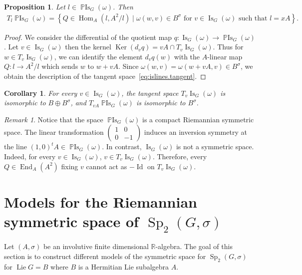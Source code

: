 \documentclass[a4paper,oneside,11pt]{amsart}
\DeclareMathOperator{\Ker}{Ker}
\DeclareMathOperator{\Hom}{Hom}
\DeclareMathOperator{\Id}{Id}
\DeclareMathOperator{\Sp}{Sp}
\DeclareMathOperator{\End}{End}
\DeclareMathOperator{\Lie}{Lie}
\DeclareMathOperator{\Is}{Is}
\DeclareMathOperator{\PIs}{\mathbb{P}Is}
\newcommand{\R}{\mathbb R}
\theoremstyle{plain}
\newtheorem{cor}[teo]{Corollary}
\newtheorem{prop}[teo]{Proposition}
\theoremstyle{definition}
\theoremstyle{remark}
\newtheorem{rem}[teo]{Remark}
\begin{document}
\begin{prop}\label{prop:islines.tangent}
    Let $l\in\PIs_G(\omega)$. Then
    \begin{align}\label{eq:islines.tangent}
    T_l\PIs_G(\omega)=\left\{Q\in\Hom_A(l,A^2/l)\mid \omega(w,v)\in B^\sigma\text{ for $v\in\Is_G(\omega)$ such that $l=xA$}\right\}.
    \end{align}
\end{prop}

\begin{proof}
    We consider the differential of the quotient map $q\colon \Is_G(\omega)\to \PIs_G(\omega)$. Let $v\in \Is_G(\omega)$ then the kernel $\Ker(d_vq)=vA\cap T_v\Is_G(\omega)$. Thus for $w\in T_v\Is_G(\omega)$, we can identify the element $d_vq(w)$ with the $A$-linear map $Q\colon l\to A^2/l$ which sends $w$ to $w+vA$. Since $\omega(w,v)=\omega(w+vA,v)\in B^\sigma$, we obtain the description of the tangent space~\eqref{eq:islines.tangent}.
\end{proof}

\begin{cor}
    For every $v\in\Is_G(\omega)$, the tangent space $T_v\Is_G(\omega)$ is isomorphic to $B\oplus B^\sigma$, and $T_{vA}\PIs_G(\omega)$ is isomorphic to $B^\sigma$.
\end{cor}

\begin{rem}
    Notice that the space $\PIs_G(\omega)$ is a compact Riemannian symmetric space. The linear transformation $\begin{pmatrix}
        1 & 0 \\
        0 & -1
    \end{pmatrix}$ induces an inversion symmetry at the line $(1,0)^tA\in \PIs_G(\omega)$. In contrast, $\Is_G(\omega)$ is not a symmetric space. Indeed, for every $v\in\Is_G(\omega)$, $v\in T_v\Is_G(\omega)$. Therefore, every $Q\in\End_A(A^2)$ fixing $v$ cannot act as $-\Id$ on $T_v\Is_G(\omega)$.
\end{rem}

\section{Models for the Riemannian symmetric space of \texorpdfstring{$\Sp_2(G,\sigma)$}{Sp2(G,sigma)}}\label{G-models}

Let $(A,\sigma)$ be an involutive finite dimensional $\R$-algebra. The goal of this section is to construct different models of the symmetric space for $\Sp_2(G,\sigma)$ for $\Lie G=B$ where $B$ is a Hermitian Lie subalgebra $A$.
\end{document}
